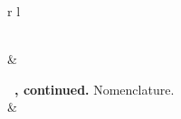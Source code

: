 \begin{center}
\begin{longtable}{r l}
\caption{Nomenclature.} \label{tab:long_nomenclature} \\

\toprule 
{} &  \\ 
\midrule 
\endfirsthead

%
{\small {\bfseries \tablename\ \thetable{}, continued.} Nomenclature.} \\
\toprule 
{} &  \\ 
\midrule 
\endhead

\midrule 
{} \\ 
\bottomrule
\endfoot

\bottomrule
\endlastfoot


\end{longtable}
\end{center}
